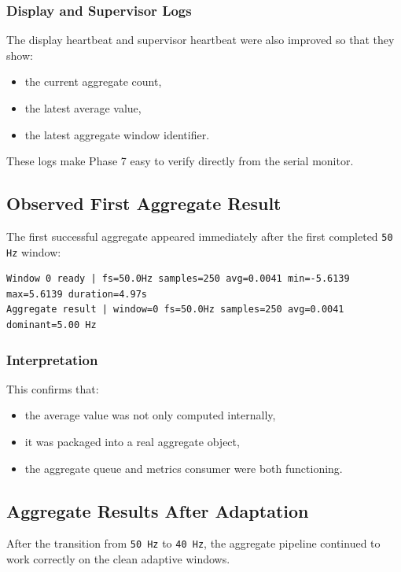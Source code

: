 \documentclass[12pt,a4paper]{article}
\begin{document}
\subsubsection{Display and Supervisor Logs}

The display heartbeat and supervisor heartbeat were also improved so that they
show:

\begin{itemize}
    \item the current aggregate count,
    \item the latest average value,
    \item the latest aggregate window identifier.
\end{itemize}

These logs make Phase 7 easy to verify directly from the serial monitor.

\subsection{Observed First Aggregate Result}

The first successful aggregate appeared immediately after the first completed
\texttt{50 Hz} window:

\begin{lstlisting}
Window 0 ready | fs=50.0Hz samples=250 avg=0.0041 min=-5.6139 max=5.6139 duration=4.97s
Aggregate result | window=0 fs=50.0Hz samples=250 avg=0.0041 dominant=5.00 Hz
\end{lstlisting}

\subsubsection*{Interpretation}

This confirms that:

\begin{itemize}
    \item the average value was not only computed internally,
    \item it was packaged into a real aggregate object,
    \item the aggregate queue and metrics consumer were both functioning.
\end{itemize}

\subsection{Aggregate Results After Adaptation}

After the transition from \texttt{50 Hz} to \texttt{40 Hz}, the aggregate
pipeline continued to work correctly on the clean adaptive windows.
\end{document}
